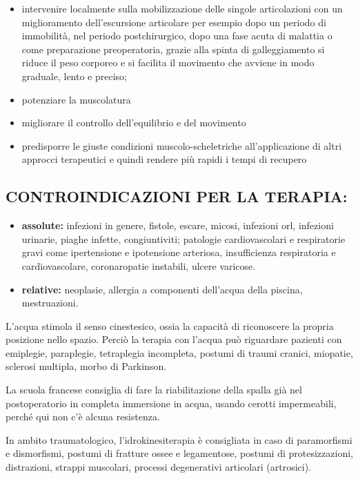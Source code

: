 \begin{itemize}
\item 
intervenire localmente sulla mobilizzazione delle singole
articolazioni con un miglioramento dell'escursione articolare per
esempio dopo un periodo di immobilità, nel periodo postchirurgico, dopo
una fase acuta di malattia o come preparazione preoperatoria, grazie
alla spinta di galleggiamento si riduce il peso corporeo e si facilita
il movimento che avviene in modo graduale, lento e preciso;
\item 
 potenziare la muscolatura
\item 
migliorare il controllo dell'equilibrio e del movimento
\item 
 predisporre le giuste condizioni muscolo-scheletriche all'applicazione
di altri approcci terapeutici e quindi rendere più rapidi i tempi di
recupero

 \end{itemize}
 
\subsection{CONTROINDICAZIONI PER LA TERAPIA:}

 \begin{itemize}

\item 
\textbf{assolute:} infezioni in genere, fistole, escare, micosi,
infezioni orl, infezioni urinarie, piaghe infette, congiuntiviti;
patologie cardiovascolari e respiratorie gravi come ipertensione e
ipotensione arteriosa, insufficienza respiratoria e cardiovascolare,
coronaropatie instabili, ulcere varicose.
\item 
\textbf{relative:} neoplasie, allergia a componenti dell'acqua della
piscina, mestruazioni.
 \end{itemize}
 
L'acqua stimola il senso cinestesico, ossia la capacità di riconoscere
la propria posizione nello spazio. Perciò la terapia con l'acqua può
riguardare pazienti con emiplegie, paraplegie, tetraplegia incompleta,
postumi di traumi cranici, miopatie, sclerosi multipla, morbo di
Parkinson.

La scuola francese consiglia di fare la riabilitazione della spalla già
nel postoperatorio in completa immersione in acqua, usando cerotti
impermeabili, perché qui non c'è alcuna resistenza.

In ambito traumatologico, l'idrokinesiterapia è consigliata in caso di
paramorfismi e dismorfismi, postumi di fratture ossee e legamentose,
postumi di protesizzazioni, distrazioni, strappi muscolari, processi
degenerativi articolari (artrosici).

